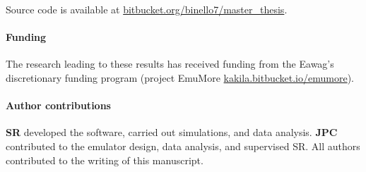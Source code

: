 \documentclass[12pt,a4paper,english,twocolumn,fleqn]{narms}
\begin{document}
Source code is available at \url{bitbucket.org/binello7/master_thesis}.

\paragraph*{Funding} The research leading to these results has received funding from the Eawag's discretionary funding program (project EmuMore \url{kakila.bitbucket.io/emumore}).

\paragraph*{Author contributions} \textbf{SR} developed the software, carried out simulations, and data analysis. \textbf{JPC} contributed to the emulator design, data analysis, and supervised SR. All authors contributed to the writing of this manuscript.

\sloppy


\end{document}
